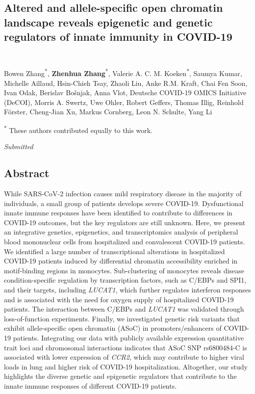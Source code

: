 \documentclass{book}
\begin{document}
\renewcommand{\thetable}{\textbf{Table \arabic{chapter}.\arabic{table}}}
\renewcommand{\thefigure}{\textbf{Figure \arabic{chapter}.\arabic{figure}}}

\begin{refsection} %

\chapter{Altered and allele-specific open chromatin landscape reveals epigenetic and genetic regulators of innate immunity in COVID-19 \\~~}
Bowen Zhang\textsuperscript{*}, \textbf{Zhenhua Zhang}\textsuperscript{*}, Valerie A. C. M. Koeken\textsuperscript{*}, Saumya Kumar, Michelle Aillaud, Hsin-Chieh Tsay, Zhaoli Liu, Anke R.M. Kraft, Chai Fen Soon, Ivan Odak, Berislav Bošnjak, Anna Vlot, Deutsche COVID-19 OMICS Initiative (DeCOI), Morris A. Swertz, Uwe Ohler, Robert Geffers, Thomas Illig, Reinhold Förster, Cheng-Jian Xu, Markus Cornberg, Leon N. Schulte, Yang Li

\vfill
\begin{flushright}
  \textsuperscript{*} These authors contributed equally to this work. \par
  \textit{Submitted}
\end{flushright}

\clearpage
\newpage
\section*{Abstract}
While SARS-CoV-2 infection causes mild respiratory disease in the majority of individuals, a small group of patients develops severe COVID-19.
Dysfunctional innate immune responses have been identified to contribute to differences in COVID-19 outcomes, but the key regulators are still unknown.
Here, we present an integrative genetics, epigenetics, and transcriptomics analysis of peripheral blood mononuclear cells from hospitalized and convalescent COVID-19 patients.
We identified a large number of transcriptional alterations in hospitalized COVID-19 patients induced by differential chromatin accessibility enriched in motif-binding regions in monocytes.
Sub-clustering of monocytes reveals disease condition-specific regulation by transcription factors, such as C/EBPs and SPI1, and their targets, including \textit{LUCAT1}, which further regulates interferon responses and is associated with the need for oxygen supply of hospitalized COVID-19 patients.
The interaction between C/EBPs and \textit{LUCAT1} was validated through loss-of-function experiments.
Finally, we investigated genetic risk variants that exhibit allele-specific open chromatin (ASoC) in promoters/enhancers of COVID-19 patients.
Integrating our data with publicly available expression quantitative trait loci and chromosomal interactions indicates that ASoC SNP rs6800484-C is associated with lower expression of \textit{CCR2}, which may contribute to higher viral loads in lung and higher risk of COVID-19 hospitalization.
Altogether, our study highlights the diverse genetic and epigenetic regulators that contribute to the innate immune responses of different COVID-19 patients.


\end{refsection}
\end{document}
